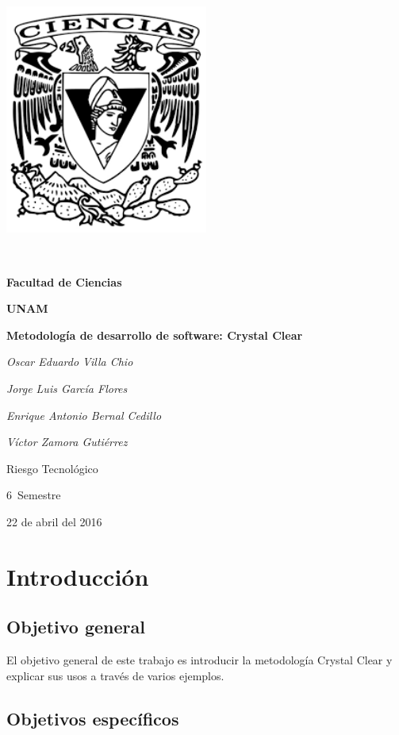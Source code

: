 \documentclass[12pt,a4paper]{article}
\begin{document}
\begin{titlepage}
	\centering
	\includegraphics[width=0.5\textwidth]{./images/logo_ciencias}\par\
	{\LARGE\bf Facultad de Ciencias \par}
	{\LARGE\bf UNAM \par}
	\vspace{1cm}
	{\huge\bfseries Metodolog\'ia de desarrollo de software: Crystal Clear\par}
	\vspace{2cm}
	{\Large\itshape Oscar Eduardo Villa Chio\par}
	{\Large\itshape Jorge Luis Garc\'ia Flores\par}
	{\Large\itshape Enrique Antonio Bernal Cedillo\par}
	{\Large\itshape V\'ictor Zamora Guti\'errez\par}
	\vspace{0.5cm}
	{\large Riesgo Tecnol\'ogico\par 6\textdegree \ Semestre\par}
	{\large 22 de abril del 2016}
\end{titlepage}
\section{Introducci\'on}
\subsection{Objetivo general}
El objetivo general de este trabajo es introducir la metodolog\'ia Crystal Clear y explicar sus usos a trav\'es de varios ejemplos.
\subsection{Objetivos espec\'ificos}
\end{document}
